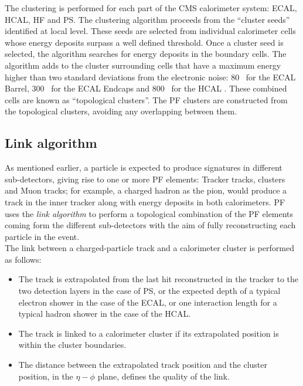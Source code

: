\noindent The clustering is performed for each part of the CMS calorimeter system: ECAL, HCAL, HF and PS. The 
clustering algorithm proceeds from the ``cluster seeds'' identified at local level. These seeds are selected from 
individual calorimeter cells whose energy deposits surpass a well defined threshold. Once a cluster seed is selected,
the algorithm searches for energy deposits in the  boundary cells. The algorithm adds to the cluster surrounding cells 
that have a maximum energy higher than two standard deviations from the electronic noise: 80 \MeV~for the ECAL Barrel,
300 \MeV~for the ECAL Endcaps and 800 \MeV~for the HCAL \cite{PFAlgorithm}. These combined cells are 
known as ``topological clusters''. The PF clusters are constructed from the topological 
clusters, avoiding any overlapping between them. 

\subsection{Link algorithm}
\label{subsec:Linkalgorithm}

\noindent As mentioned earlier, a particle is expected to produce signatures in different sub-detectors, giving rise to one or more 
PF elements: Tracker tracks, clusters and Muon tracks; for example, a charged hadron as the pion, would produce a 
track in the inner tracker along with energy deposits in both calorimeters. PF uses the \textit{link algorithm} to perform 
a topological combination of the PF elements coming form the different sub-detectors with the aim 
of fully reconstructing each particle in the event. \\

\noindent The link between a charged-particle track and a calorimeter cluster is performed as follows:

\begin{itemize}
 \item The track is extrapolated from the last hit reconstructed in the tracker to the two detection layers 
 in the case of PS, or the expected depth of a typical electron shower in the case of the ECAL, or
 one interaction length for a typical hadron shower in the case of the HCAL. 
 \item The track is linked to a calorimeter cluster if its extrapolated position is within the cluster boundaries. 
 \item The distance between the extrapolated track position and the cluster position, in the $\eta-\phi$ plane, defines the quality of the link. 
\end{itemize}

